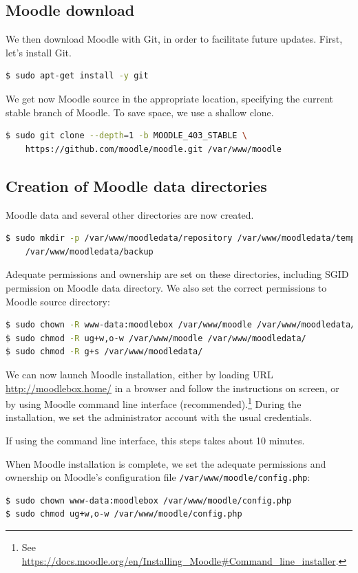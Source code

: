 \documentclass[12pt]{article}
\begin{document}
\subsection{Moodle download}

We then download Moodle with Git, in order to facilitate future updates.
First, let's install Git.
\begin{lstlisting}[language=bash]
$ sudo apt-get install -y git
\end{lstlisting}

We get now Moodle source in the appropriate location, specifying the current stable branch of Moodle.
To save space, we use a shallow clone.
\begin{lstlisting}[language=bash]
$ sudo git clone --depth=1 -b MOODLE_403_STABLE \
    https://github.com/moodle/moodle.git /var/www/moodle
\end{lstlisting}

\subsection{Creation of Moodle data directories}

Moodle data and several other directories are now created.
\begin{lstlisting}[language=bash]
$ sudo mkdir -p /var/www/moodledata/repository /var/www/moodledata/temp \
    /var/www/moodledata/backup
\end{lstlisting}
Adequate permissions and ownership are set on these directories, including SGID permission on Moodle data directory.
We also set the correct permissions to Moodle source directory:
\begin{lstlisting}[language=bash]
$ sudo chown -R www-data:moodlebox /var/www/moodle /var/www/moodledata/
$ sudo chmod -R ug+w,o-w /var/www/moodle /var/www/moodledata/
$ sudo chmod -R g+s /var/www/moodledata/
\end{lstlisting}

We can now launch Moodle installation, either by loading URL \url{http://moodlebox.home/} in a browser and follow the instructions on screen, or by using Moodle command line interface (recommended).\footnote{See \url{https://docs.moodle.org/en/Installing_Moodle\#Command_line_installer}.}
During the installation, we set the administrator account with the usual credentials.

If using the command line interface, this steps takes about 10 minutes.

When Moodle installation is complete, we set the adequate permissions and ownership on Moodle's configuration file \lstinline{/var/www/moodle/config.php}:
\begin{lstlisting}[language=bash]
$ sudo chown www-data:moodlebox /var/www/moodle/config.php
$ sudo chmod ug+w,o-w /var/www/moodle/config.php
\end{lstlisting}
\end{document}

